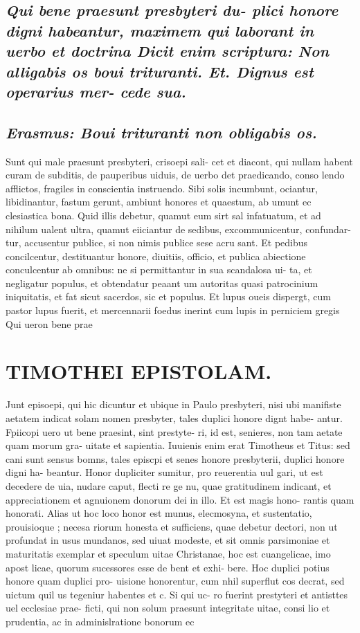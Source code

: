 \documentclass{article}
\begin{document}
\begin{pages}
\subsection*{\textit{Qui bene praesunt presbyteri du- plici honore digni habeantur, maximem qui laborant in uerbo et doctrina Dicit enim scriptura: Non alligabis os boui trituranti. Et. Dignus est operarius mer- cede sua. }}
{}
\subsection*{\textit{Erasmus: Boui trituranti non obligabis os. }}\pstart Sunt qui male praesunt presbyteri, crisoepi sali- cet et diacont, qui nullam habent curam de subditis, de pauperibus uiduis, de uerbo det praedicando, conso lendo afflictos, fragiles in conscientia instruendo. Sibi solis incumbunt, ociantur, libidinantur, fastum gerunt, ambiunt honores et quaestum, ab umunt ec clesiastica bona. Quid illis debetur, quamut eum sirt sal infatuatum, et ad nihilum ualent ultra, quamut eiiciantur de sedibus, excommunicentur, confundar- tur, accusentur publice, si non nimis publice sese acru sant. Et pedibus concilcentur, destituantur honore, diuitiis, officio, et publica abiectione conculcentur ab omnibus: ne si permittantur in sua scandalosa ui- ta, et negligatur populus, et obtendatur peaant um autoritas quasi patrocinium iniquitatis, et fat sicut sacerdos, sic et populus. Et lupus oueis dispergt, cum pastor lupus fuerit, et mercennarii foedus inerint cum lupis in perniciem gregis Qui ueron bene prae  \pend
\section*{TIMOTHEI EPISTOLAM. }
\marginpar{[ p.137 ]}\pstart Junt episoepi, qui hic dicuntur et ubique in Paulo presbyteri, nisi ubi manifiste aetatem indicat solam nomen presbyter, tales duplici honore dignt habe- antur. Fpiicopi uero ut bene praesint, sint prestyte- ri, id est, senieres, non tam aetate quam morum gra- uitate et sapientia. Iuuienis enim erat Timotheus et Titus: sed cani sunt sensus bomns, tales episcpi et senes honore presbyterii, duplici honore digni ha- beantur. Honor dupliciter sumitur, pro reuerentia uul gari, ut est decedere de uia, nudare caput, flecti re ge nu, quae gratitudinem indicant, et appreciationem et agnuionem donorum dei in illo. Et est magis hono- rantis quam honorati. Alias ut hoc loco honor est munus, elecmosyna, et sustentatio, prouisioque ; necesa riorum honesta et sufficiens, quae debetur dectori, non ut profundat in usus mundanos, sed uiuat modeste, et sit omnis parsimoniae et maturitatis exemplar et speculum uitae Christanae, hoc est cuangelicae, imo apost licae, quorum sucessores esse de bent et exhi- bere. Hoc duplici potius honore quam duplici pro- uisione honorentur, cum nhil superflut cos decrat, sed uictum quil us tegeniur habentes et c. Si qui uc- ro fuerint prestyteri et antisttes uel ecclesiae prae- ficti, qui non solum praesunt integritate uitae, consi lio et prudentia, ac in adminislratione bonorum ec  \pend

\end{pages}
\end{document}
